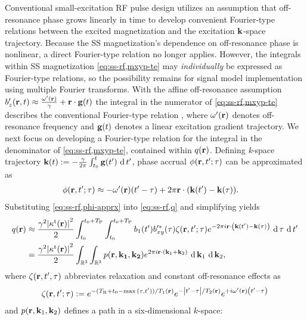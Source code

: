 Conventional small-excitation RF pulse design
utilizes an assumption
that off-resonance phase
grows linearly in time
to develop convenient Fourier-type relations
between the excited magnetization
and the excitation $\mathbf{k}$-space trajectory.
Because the SS magnetization's dependence
on off-resonance phase is nonlinear,
a direct Fourier-type relation no longer applies.
However,
the integrals within 
SS magnetization \eqref{eq:ss-rf,mxyp-te}
may \emph{individually} be expressed 
as Fourier-type relations,
so the possibility remains
for signal model implementation
using multiple Fourier transforms.
With the affine off-resonance assumption
$\bzp\prt \approx \frac{\omp\pr}{\gam} + \bmr \cdot \bmg\pt$
the integral in the numerator 
of \eqref{eq:ss-rf,mxyp-te}
describes the conventional Fourier-type relation \cite{pauly:89:aks},
where $\omp\pr$ denotes off-resonance frequency
and $\bmg\pt$ denotes a linear excitation gradient trajectory.
We next focus on developing a Fourier-type relation
for the integral in the denominator 
of \eqref{eq:ss-rf,mxyp-te},
contained within $q\pr$.
Defining \emph{k}-space trajectory 
$\bmk\pt := -\frac{\gam}{2\pi} \int_{t_0}^t \bmg(t') \der t'$, 
phase accrual $\phi(\mathbf{r}, t'; \tau)$ 
can be approximated as 
\begin{align}
	\phi(\bmr, t'; \tau) &\approx 
		-\omp\pr \paren{t' - \tau} 
		+ 2\pi \bmr \cdot \paren{\bmk(t') - \bmk(\tau)}.
	\label{eq:ss-rf,phi-apprx}
\end{align}
Substituting \eqref{eq:ss-rf,phi-apprx} 
into \eqref{eq:ss-rf,q} and simplifying yields
\begin{align}
	q\pr &\approx 
		\frac{\gam^2 \abs{\stx\pr}^2 }{2} \int_{t_0}^{t_0+\TP} \int_{t_0}^{t_0+\TP} 
		\bone(t') b'^*_{xy}(\tau) \zeta(\bmr, t'; \tau) e^{-2\pi i \bmr \cdot
		\paren{\bmk(t') - \bmk(\tau)}} \der \tau \der t' 
		\label{eq:ss-rf,q-zeta} 
		\\
	&= 
		\frac{\gam^2 \abs{\stx\pr}^2 }{2} \int_{\real^3} \int_{\real^3} 
		p(\bmr, \mathbf{k_1}, \mathbf{k_2}) e^{2\pi i \bmr \cdot (\bmk_1 + \bmk_2)} 
		\der \bmk_1 \der \bmk_2,
		\label{eq:ss-rf,q-fourier}
\end{align}
where $\zeta(\mathbf{r}, t', \tau)$ abbreviates 
relaxation and constant off-resonance effects as
\begin{align}
	\zeta(\bmr, t'; \tau) := 
		e^{-(\TR + t_0 - \max{(\tau, t'))}/\To\pr} e^{-\abs{t'-\tau}/\Tt\pr} 
		e^{+i\omp\pr \paren{t'-\tau}}
	\label{eq:ss-rf,zeta}
\end{align}
and $p(\mathbf{r}, \mathbf{k}_1, \mathbf{k}_2)$ defines a path in a six-dimensional $k$-space:
